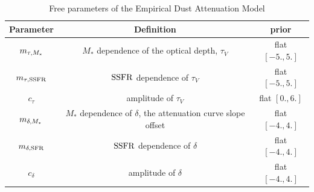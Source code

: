 \begin{table}
    \caption{Free parameters of the Empirical Dust Attenuation Model}
    \begin{center}
        \begin{tabular}{ccc} \toprule
            Parameter & Definition & prior\\[3pt] \hline\hline
            $m_{\tau,M_*}$ & $M_*$ dependence of the optical depth, $\tau_V$ & flat $[-5., 5.]$\\
            $m_{\tau,{\rm SSFR}}$ & ${\rm SSFR}$ dependence of $\tau_V$  & flat $[-5., 5.]$\\
            $c_{\tau}$ & amplitude of $\tau_V$ & flat $[0., 6.]$\\
            $m_{\delta,M_*}$ & $M_*$ dependence of $\delta$, the attenuation curve slope offset & flat $[-4., 4.]$\\
            $m_{\delta,{\rm SFR}}$ & ${\rm SSFR}$ dependence of $\delta$ & flat $[-4., 4.]$\\
            $c_{\delta}$ & amplitude of $\delta$ & flat $[-4., 4.]$\\
            \hline
        \end{tabular} \label{tab:free_param}
    \end{center}
\end{table}

